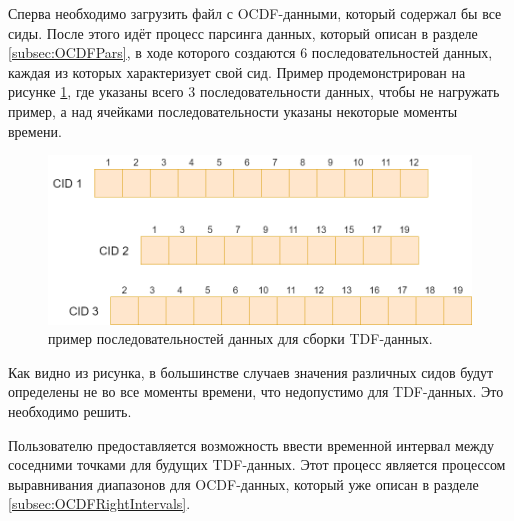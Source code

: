 {\standartFont

  \par Сперва необходимо загрузить файл с OCDF-данными, который содержал бы все сиды. После этого идёт процесс парсинга данных, который описан в разделе \ref{subsec:OCDFPars}, в ходе которого создаются 6 последовательностей данных, каждая из которых характеризует свой сид. Пример продемонстрирован на рисунке \ref{fig:CreateTDFstage1}, где указаны всего 3 последовательности данных, чтобы не нагружать пример, а над ячейками последовательности указаны некоторые моменты времени.

  \begin{figure}[H]
    \centering
    \includegraphics[width=\textwidth]{images/forDataManipulator/CreateTDFstage1.drawio.png}
    \caption{пример последовательностей данных для сборки TDF-данных.}
    \label{fig:CreateTDFstage1}
  \end{figure}

  \par Как видно из рисунка, в большинстве случаев значения различных сидов будут определены не во все моменты времени, что недопустимо для TDF-данных. Это необходимо решить.

  \par Пользователю предоставляется возможность ввести временной интервал между соседними точками для будущих TDF-данных. Этот процесс является процессом выравнивания диапазонов для OCDF-данных, который уже описан в разделе \ref{subsec:OCDFRightIntervals}.

}
